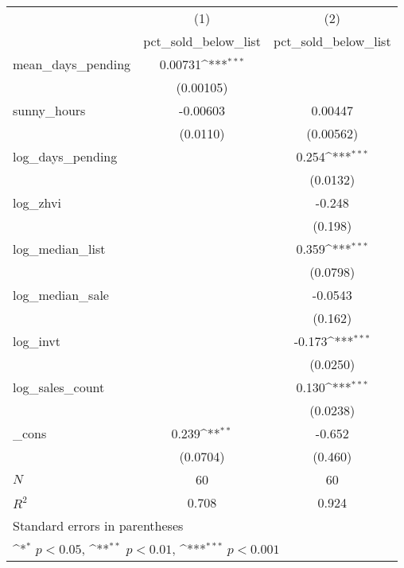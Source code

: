 {
\def\sym#1{\ifmmode^{#1}\else\(^{#1}\)\fi}
\begin{tabular}{l*{2}{c}}
\hline\hline
            &\multicolumn{1}{c}{(1)}&\multicolumn{1}{c}{(2)}\\
            &\multicolumn{1}{c}{pct\_sold\_below\_list}&\multicolumn{1}{c}{pct\_sold\_below\_list}\\
\hline
mean\_days\_pending&     0.00731\sym{***}&                     \\
            &   (0.00105)         &                     \\
[1em]
sunny\_hours &    -0.00603         &     0.00447         \\
            &    (0.0110)         &   (0.00562)         \\
[1em]
log\_days\_pending&                     &       0.254\sym{***}\\
            &                     &    (0.0132)         \\
[1em]
log\_zhvi    &                     &      -0.248         \\
            &                     &     (0.198)         \\
[1em]
log\_median\_list&                     &       0.359\sym{***}\\
            &                     &    (0.0798)         \\
[1em]
log\_median\_sale&                     &     -0.0543         \\
            &                     &     (0.162)         \\
[1em]
log\_invt    &                     &      -0.173\sym{***}\\
            &                     &    (0.0250)         \\
[1em]
log\_sales\_count&                     &       0.130\sym{***}\\
            &                     &    (0.0238)         \\
[1em]
\_cons      &       0.239\sym{**} &      -0.652         \\
            &    (0.0704)         &     (0.460)         \\
\hline
\(N\)       &          60         &          60         \\
\(R^{2}\)   &       0.708         &       0.924         \\
\hline\hline
\multicolumn{3}{l}{\footnotesize Standard errors in parentheses}\\
\multicolumn{3}{l}{\footnotesize \sym{*} \(p<0.05\), \sym{**} \(p<0.01\), \sym{***} \(p<0.001\)}\\
\end{tabular}
}
